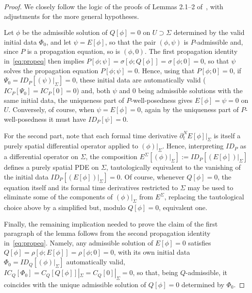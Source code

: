 \documentclass[a4paper]{article}
\theoremstyle{remark}
\newcommand{\del}{\partial}
\begin{document}
\begin{proof}
We closely follow the logic of the proofs of Lemmas 2.1--2
of~\cite{khgp-ckid}, with adjustments for the more general hypotheses.

Let $\phi$ be the admissible solution of $Q[\phi] = 0$ on $U \supset
\Sigma$ determined by the valid initial data $\Phi_0$, and let $\psi =
E[\phi]$, so that the pair $(\phi,\psi)$ is $P$-admissible and, since
$P$ is a propagation equation, so is $(\phi,0)$. The first propagation
identity in~\eqref{eq:propeq} then
implies $P[\phi; \psi] = \sigma[\phi; Q[\phi]] = \sigma[\phi; 0] = 0$,
so that $\psi$ solves the propagation equation $P[\phi; \psi] = 0$.
Hence, using that $P[\phi;0] = 0$, if $\Psi_0 = ID_P[(\psi)|_\Sigma] =
0$, these initial data are automatically valid ($IC_P[\Psi_0] = IC_P[0]
= 0$) and, both $\psi$ and $0$ being admissible solutions with the same
initial data, the uniqueness part of $P$-well-posedness gives $E[\phi]
= \psi = 0$ on $U$. Conversely, of course, when $\psi = E[\phi] = 0$,
again by the uniqueness part of $P$-well-posedness it must have
$ID_P[\psi] = 0$.

For the second part, note that each formal time derivative $\del_t^N
E[\phi]|_\Sigma$ is itself a purely spatial differential operator
applied to $(\phi)|_\Sigma$. Hence, interpreting $ID_P$ as a
differential operator on $\Sigma$, the composition
$E^\Sigma[(\phi)|_\Sigma] := ID_P[(E[\phi])|_\Sigma]$ defines a purely
spatial PDE on $\Sigma$, tautologically equivalent to the vanishing of
the initial data $ID_P[(E[\phi])|_\Sigma] = 0$. Of course, whenever
$Q[\phi] = 0$, the equation itself and its formal time derivatives
restricted to $\Sigma$ may be used to eliminate some of the components
of $(\phi)|_\Sigma$ from $E^\Sigma$, replacing the tautological choice
above by a simplified but, modulo $Q[\phi] = 0$, equivalent one.

Finally, the remaining implication needed to prove the claim of the first
paragraph of the lemma follows from the second propagation identity
in~\eqref{eq:propeq}. Namely, any admissible solution of $E[\phi]
= 0$ satisfies $Q[\phi] = \rho[\phi; E[\phi]] = \rho[\phi; 0] = 0$,
with its own initial data $\Phi_0 = ID_Q[(\phi)|_\Sigma]$
automatically valid, $IC_Q[\Phi_0] = C_Q[Q[\phi]]|_\Sigma =
C_Q[0]|_\Sigma = 0$, so that, being $Q$-admissible, it coincides with
the unique admissible solution of $Q[\phi] = 0$ determined by $\Phi_0$.
\end{proof}
\end{document}
